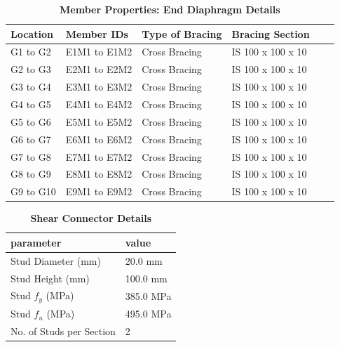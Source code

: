\documentclass[12pt,a4paper]{report}
\numberwithin{table}{chapter}
\numberwithin{figure}{chapter}
\begin{document}
\begin{longtable}{|L{2.2cm}|L{2.2cm}|L{3.0cm}|L{2.5cm}|C{1.8cm}|C{1.8cm}|}
\caption{\textbf{Member Properties: End Diaphragm Details}}
\hline
\textbf{Location} & \textbf{Member IDs} & \textbf{Type of Bracing} & \textbf{Bracing Section} \\
\hline
G1 to G2 & E1M1 to E1M2 & Cross Bracing & IS 100 x 100 x 10 \\[6pt]
\hline
G2 to G3 & E2M1 to E2M2 & Cross Bracing & IS 100 x 100 x 10 \\[6pt]
\hline
G3 to G4 & E3M1 to E3M2 & Cross Bracing & IS 100 x 100 x 10 \\[6pt]
\hline
G4 to G5 & E4M1 to E4M2 & Cross Bracing & IS 100 x 100 x 10 \\[6pt]
\hline
G5 to G6 & E5M1 to E5M2 & Cross Bracing & IS 100 x 100 x 10 \\[6pt]
\hline
G6 to G7 & E6M1 to E6M2 & Cross Bracing & IS 100 x 100 x 10 \\[6pt]
\hline
G7 to G8 & E7M1 to E7M2 & Cross Bracing & IS 100 x 100 x 10 \\[6pt]
\hline
G8 to G9 & E8M1 to E8M2 & Cross Bracing & IS 100 x 100 x 10 \\[6pt]
\hline
G9 to G10 & E9M1 to E9M2 & Cross Bracing & IS 100 x 100 x 10 \\[6pt]
\hline
\end{longtable}



\label{subsec:shear-connectors}

\vspace{2.2em}

\vspace{0.4em}
\begin{longtable}{|L{5.5cm}|p{10.0cm}|}
\caption{\textbf{Shear Connector Details}}
\hline
\textbf{parameter} & \textbf{value} \\
\hline
\textnormal{Stud Diameter (mm)} & 20.0 mm \\[6pt]
\hline
\textnormal{Stud Height (mm)} & 100.0 mm \\[6pt]
\hline
\textnormal{Stud $f_y$ (MPa)} & 385.0 MPa \\[6pt]
\hline
\textnormal{Stud $f_u$ (MPa)} & 495.0 MPa \\[6pt]
\hline
\textnormal{No. of Studs per Section} & 2 \\[6pt]
\hline
\end{longtable}



\label{subsec:safety-factors}
\end{document}
